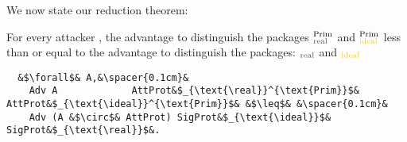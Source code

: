 %
We now state our reduction theorem:
%
\begin{theorem}\label{theo:redprot}
  For every attacker \A, the advantage to distinguish 
  the packages \pattprot$_{\text{\real}}^{\text{Prim}}$ and \pattprot$_{\text{\ideal}}^{\text{Prim}}$
  less than or equal to the advantage to distinguish 
  the packages: \psigprot$_{\text{\real}}$ and \psigprot$_{\text{\ideal}}$
  \begin{center}
      \begin{minipage}{0.8\columnwidth}
     \begin{verbatim}
  &$\forall$& A,&\spacer{0.1cm}& 
    Adv A             AttProt&$_{\text{\real}}^{\text{Prim}}$& AttProt&$_{\text{\ideal}}^{\text{Prim}}$& &$\leq$& &\spacer{0.1cm}&
    Adv (A &$\circ$& AttProt) SigProt&$_{\text{\ideal}}$& SigProt&$_{\text{\real}}$&.
    \end{verbatim}
     \end{minipage}
  \end{center}
\end{theorem}
%
